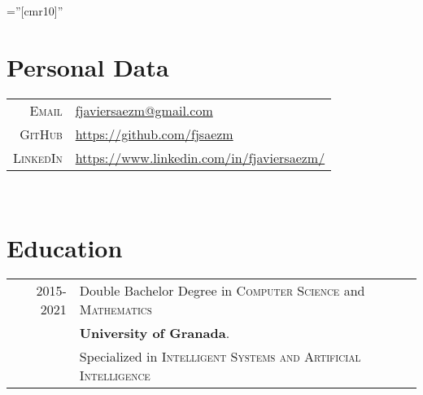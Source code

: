 \documentclass[a4paper,11pt]{article} %
\begin{document}
\pagestyle{empty} %

\font\fb=''[cmr10]'' %


\par{\bigskip\par} %

\section{Personal Data}

\begin{tabular}{rl}
  \textsc{Email} & \href{fjaviersaezm@gmail.com}{fjaviersaezm@gmail.com}\\ 
  \textsc{GitHub} & \href{https://github.com/fjsaezm}{https://github.com/fjsaezm}\\ 
  \textsc{LinkedIn} & \href{https://www.linkedin.com/in/fjaviersaezm/}{https://www.linkedin.com/in/fjaviersaezm/}
\end{tabular}\\



\section{Education}

\begin{tabular}{r|p{11cm}}	
  \textsc{2015-2021}  & Double Bachelor Degree in \textsc{Computer Science} and \textsc{Mathematics}
  \\ & \textbf{University of Granada}.\\
& Specialized in \textsc{Intelligent Systems and Artificial Intelligence}
\end{tabular}\\

\end{document}
